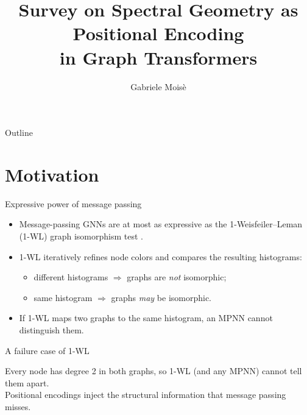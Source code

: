 \documentclass[aspectratio=169,11pt]{beamer}
\title{Survey on Spectral Geometry as Positional Encoding\\in Graph Transformers}
\author{Gabriele Moisè}
\institute{Università degli Studi di Milano-Bicocca}
\date{}
\begin{document}
\begin{frame}[plain]
  \titlepage
\end{frame}

\begin{frame}{Outline}
  \tableofcontents
\end{frame}

\section{Motivation}

\begin{frame}{Expressive power of message passing}
  \begin{itemize}
    \item Message-passing GNNs are at most as expressive as the
          \alert{1-Weisfeiler--Leman (1-WL)} graph isomorphism test
          \citep{xu2019powerful}.
    \item 1-WL iteratively refines node colors and compares the resulting
          histograms:
          \begin{itemize}
            \item different histograms $\Rightarrow$ graphs are \emph{not} isomorphic;
            \item same histogram $\Rightarrow$ graphs \emph{may} be isomorphic.
          \end{itemize}
    \item If 1-WL maps two graphs to the same histogram, an MPNN cannot
          distinguish them.
  \end{itemize}
\end{frame}

\begin{frame}{A failure case of 1-WL}
  \centering

  \bigskip
  Every node has degree 2 in both graphs, so 1-WL (and any MPNN) cannot tell
  them apart.\\
  \alert{Positional encodings} inject the structural information that message
  passing misses.
\end{frame}
\end{document}
